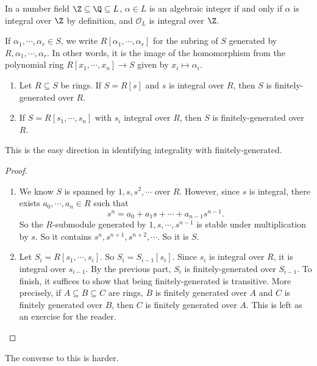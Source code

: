 \documentclass[a4paper]{article}
\begin{document}
\begin{eg}
  In a number field $\Z \subseteq \Q \subseteq L$, $\alpha \in L$ is an algebraic integer if and only if $\alpha$ is integral over $\Z$ by definition, and $\mathcal{O}_L$ is integral over $\Z$.
\end{eg}

\begin{notation}
  If $\alpha_1, \cdots, \alpha_r \in S$, we write $R[\alpha_1, \cdots, \alpha_r]$ for the subring of $S$ generated by $R, \alpha_1, \cdots, \alpha_r$. In other words, it is the image of the homomorphism from the polynomial ring $R[x_1, \cdots, x_n] \to S$ given by $x_i \mapsto \alpha_i$.
\end{notation}

\begin{prop}\leavevmode
  \begin{enumerate}
    \item Let $R \subseteq S$ be rings. If $S = R[s]$ and $s$ is integral over $R$, then $S$ is finitely-generated over $R$.
    \item If $S = R[s_1, \cdots, s_n]$ with $s_i$ integral over $R$, then $S$ is finitely-generated over $R$.
  \end{enumerate}
\end{prop}
This is the easy direction in identifying integrality with finitely-generated.

\begin{proof}\leavevmode
  \begin{enumerate}
    \item We know $S$ is spanned by $1, s, s^2, \cdots$ over $R$. However, since $s$ is integral, there exists $a_0, \cdots, a_n \in R$ such that
      \[
        s^n = a_0 + a_1 s + \cdots + a_{n - 1}s^{n - 1}.
      \]
      So the $R$-submodule generated by $1, s, \cdots, s^{n - 1}$ is stable under multiplication by $s$. So it contains $s^n, s^{n + 1}, s^{n + 2}, \cdots$. So it is $S$.
    \item Let $S_i = R[s_1, \cdots, s_i]$. So $S_i = S_{i - 1}[s_i]$. Since $s_i$ is integral over $R$, it is integral over $s_{i - 1}$. By the previous part, $S_i$ is finitely-generated over $S_{i - 1}$. To finish, it suffices to show that being finitely-generated is transitive. More precisely, if $A \subseteq B \subseteq C$ are rings, $B$ is finitely generated over $A$ and $C$ is finitely generated over $B$, then $C$ is finitely generated over $A$. This is left as an exercise for the reader. %
  \end{enumerate}
\end{proof}
The converse to this is harder.
\end{document}
